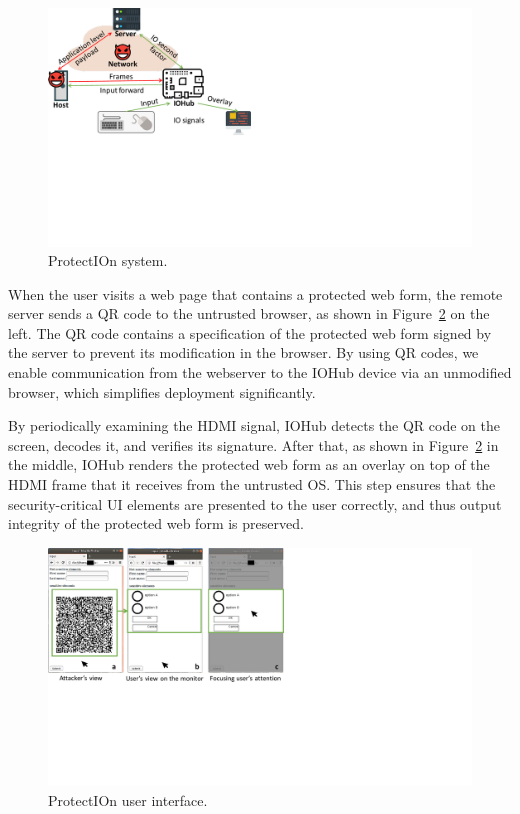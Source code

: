 \documentclass[letterpaper,twocolumn,10pt]{article}
\newcommand{\protection}{\textsf{ProtectIOn}\xspace}
\newcommand{\hub}{\textsf{IOHub}\xspace}
\begin{document}
\begin{figure}[t]
	\centering
	\includegraphics[trim={0 8.5cm 17cm 0}, clip, width=\linewidth]{Kostiainen-Fig1.pdf}
	\caption{\protection system.}
	\label{fig:architecture}    
\end{figure}    
    
When the user visits a web page that contains a protected web form, the remote server sends a QR code to the untrusted browser, as shown in Figure~\ref{fig:screenshot} on the left. The QR code contains a specification of the protected web form signed by the server to prevent its modification in the browser. By using QR codes, we enable communication from the webserver to the \hub device via an unmodified browser, which simplifies deployment significantly.

By periodically examining the HDMI signal, \hub detects the QR code on the screen, decodes it, and verifies its signature. After that, as shown in Figure~\ref{fig:screenshot} in the middle, \hub renders the protected web form as an overlay on top of the HDMI frame that it receives from the untrusted OS. This step ensures that the security-critical UI elements are presented to the user correctly, and thus output integrity of the protected web form is preserved.

\begin{figure}    
	\centering
	\includegraphics[trim={0 8cm 15cm 0}, clip, width=0.6\linewidth]{Kostiainen-Fig2.pdf}
	\caption{\protection user interface.} 
    \label{fig:screenshot}
\end{figure}
\end{document}
